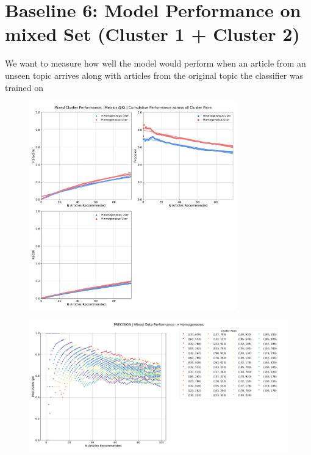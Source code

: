 \documentclass[a4paper,fontsize=9.0pt]{scrartcl}
\begin{document}
\newpage
\section{Baseline 6: Model Performance on mixed Set (Cluster 1 + Cluster 2)}
\begin{flushleft}
We want to measure how well the model would perform when an article from an unseen topic arrives along with articles from the original topic the classifier was trained on
\end{flushleft}
\begin{figure}[H]
 \includegraphics[width=0.8\textwidth]{Graphs/user_interaction_vs_model_performance_cumu_mixed_cluster.pdf}
\end{figure}
\begin{figure}[H]
 \includegraphics[width=1.0\textwidth]{Graphs/user_interaction_vs_model_performance_precision_all_cps_mixed_data_Homogeneous.pdf}
\end{figure}
\end{document}
